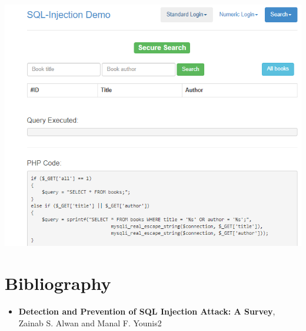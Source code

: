 \documentclass{article}
\begin{document}
\begin{center}
\includegraphics[scale=1]{f7}
\end{center}
\section*{Bibliography} 
\begin{itemize}
	\item \textbf{Detection and Prevention of SQL Injection Attack: A Survey}, Zainab S. Alwan and Manal F. Younis2
\end{itemize}
\end{document}
